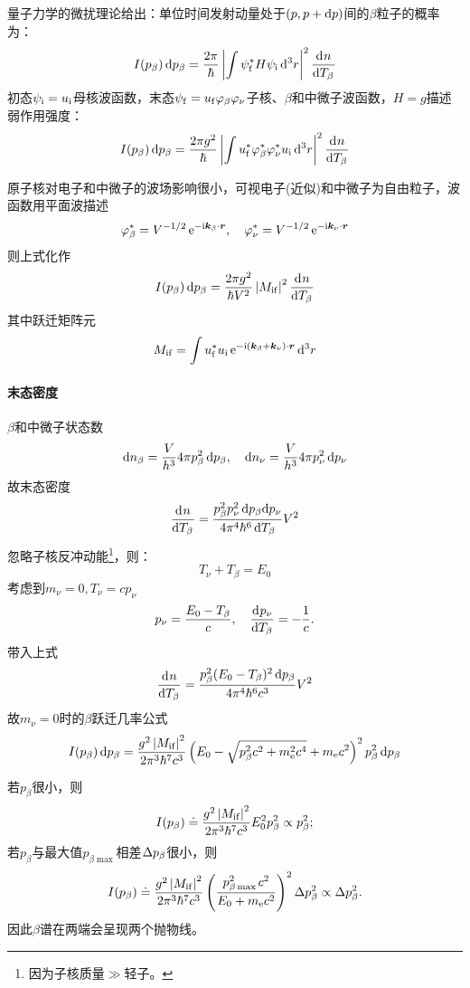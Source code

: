 量子力学的微扰理论给出：单位时间发射动量处于$(p,p+\mathop{}\!\mathrm{d} p)$间的$\beta$粒子的概率为：
\[
	I(p_\beta)\mathop{}\!\mathrm{d} p_\beta=\frac{2\pi}\hbar\left\lvert\int\psi_{\mathrm{f}}^\ast H\psi_{\mathrm{i}}\mathop{}\!\mathrm{d}^3r\right\rvert^2\frac{\mathrm{d}^{{}}n}{\mathrm{d}{T_\beta}^{{}}}
\]
初态$\psi_{\mathrm{i}}=u_{\mathrm{i}}$母核波函数，末态$\psi_{\mathrm{f}}=u_{\mathrm{f}}\varphi_\beta\varphi_\nu$子核、$\beta$和中微子波函数，$H=g$描述弱作用强度：
\[
	I(p_\beta)\mathop{}\!\mathrm{d} p_\beta=\frac{2\pi g^2}\hbar\left\lvert\int u_{\mathrm{f}}^\ast\varphi_\beta^\ast\varphi_\nu^\ast u_{\mathrm{i}}\mathop{}\!\mathrm{d}^3r\right\rvert^2\frac{\mathrm{d}^{{}}n}{\mathrm{d}{T_\beta}^{{}}}
\]

原子核对电子和中微子的波场影响很小，可视电子(近似)和中微子为自由粒子，波函数用平面波描述
\[
	\varphi_\beta^\ast=V^{-1/2}\mathop{}\!\mathrm{e}^{-\mathrm{i}\bm k_\beta\cdot\bm r},\quad\varphi_\nu^\ast=V^{-1/2}\mathop{}\!\mathrm{e}^{-\mathrm{i}\bm k_\nu\cdot\bm r}
\]
则上式化作
\[
	I(p_\beta)\mathop{}\!\mathrm{d} p_\beta=\frac{2\pi g^2}{\hbar V^2}\left\lvert M_{\mathrm{i}\mathrm{f}}\right\rvert^2\frac{\mathrm{d}^{{}}n}{\mathrm{d}{T_\beta}^{{}}}
\]
其中跃迁矩阵元
\begin{align}\label{transition matrix element}
	M_{\mathrm{i}\mathrm{f}}=\int u_{\mathrm{f}}^\ast u_{\mathrm{i}}\mathop{}\!\mathrm{e}^{-\mathrm{i}(\bm k_\beta+\bm k_\nu)\cdot\bm r}\mathop{}\!\mathrm{d}^3r
\end{align}

\paragraph{末态密度}$\beta$和中微子状态数
\[
	\mathop{}\!\mathrm{d} n_\beta=\frac V{h^3}4\pi p_\beta^2\mathop{}\!\mathrm{d} p_\beta,\quad \mathop{}\!\mathrm{d} n_\nu=\frac V{h^3}4\pi p_\nu^2\mathop{}\!\mathrm{d} p_\nu
\]
故末态密度
\[
	\frac{\mathrm{d}^{{}}n}{\mathrm{d}{T_\beta}^{{}}}=\frac{p_\beta^2p_\nu^2\mathop{}\!\mathrm{d} p_\beta\mathrm{d} p_\nu}{4\pi^4\hbar^6\mathop{}\!\mathrm{d} T_\beta}V^2
\]
忽略子核反冲动能\footnote{因为子核质量$\gg$轻子。}，则：
\[
	T_\nu+T_\beta=E_0
\]
考虑到$m_\nu=0,T_\nu=cp_\nu$
\[
	p_\nu=\frac{E_0-T_\beta}c,\quad\frac{\mathrm{d}^{{}}p_\nu}{\mathrm{d}{T_\beta}^{{}}}=-\frac1c.
\]
带入上式
\[
	\frac{\mathrm{d}^{{}}n}{\mathrm{d}{T_\beta}^{{}}}=\frac{p_\beta^2(E_0-T_\beta)^2\mathop{}\!\mathrm{d} p_\beta}{4\pi^4\hbar^6c^3}V^2
\]
故$m_\nu=0$时的$\beta$跃迁几率公式
\begin{align}\label{beta-decay Prob}
	I(p_\beta)\mathop{}\!\mathrm{d} p_\beta=\frac{g^2\left\lvert M_{\mathrm{i}\mathrm{f}}\right\rvert^2}{2\pi^3\hbar^7c^3}\left(E_0-\sqrt{p_\beta^2c^2+m_\mathrm e^2c^4}+m_\mathrm e c^2\right)^2p_\beta^2\mathop{}\!\mathrm{d} p_\beta
\end{align}
\begin{center}
\end{center}
若$p_\beta$很小，则
\[
	I(p_\beta)\doteq\frac{g^2\left\lvert M_{\mathrm{i}\mathrm{f}}\right\rvert^2}{2\pi^3\hbar^7c^3}E_0^2p_\beta^2\propto p_\beta^2;
\]
若$p_\beta$与最大值$p_{\beta\max{}}$相差$\Delta p_\beta$很小，则
\[
	I(p_\beta)\doteq\frac{g^2\left\lvert M_{\mathrm{i}\mathrm{f}}\right\rvert^2}{2\pi^3\hbar^7c^3}\left(\frac{p_{\beta\max{}}^2c^2}{E_0+m_\mathrm e c^2}\right)^2\Delta p_\beta^2\propto\Delta p_\beta^2.
\]
因此$\beta$谱在两端会呈现两个抛物线。

